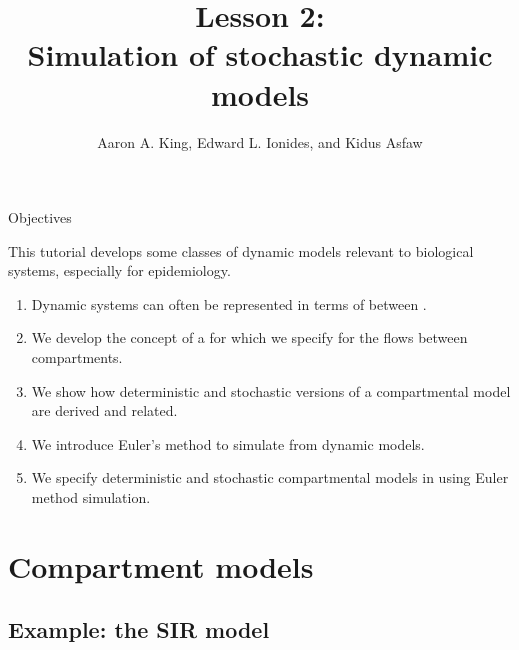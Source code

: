 

\def\CHAPTER{2}
\title{Lesson 2:\\Simulation of stochastic dynamic models}
\author{Aaron A. King, Edward L. Ionides, and Kidus Asfaw}










\maketitle



\begin{frame}{Objectives}

  This tutorial develops some classes of dynamic models relevant to biological systems, especially for epidemiology.

  \begin{enumerate}
  \item Dynamic systems can often be represented in terms of  between .
  \item We develop the concept of a  for which we specify  for the flows between compartments.
  \item We show how deterministic and stochastic versions of a compartmental model are derived and related.
  \item We introduce Euler's method to simulate from dynamic models.
  \item We specify deterministic and stochastic compartmental models in  using Euler method simulation.
  \end{enumerate}

\end{frame}

\section{Compartment models}

\subsection{Example: the SIR model}

